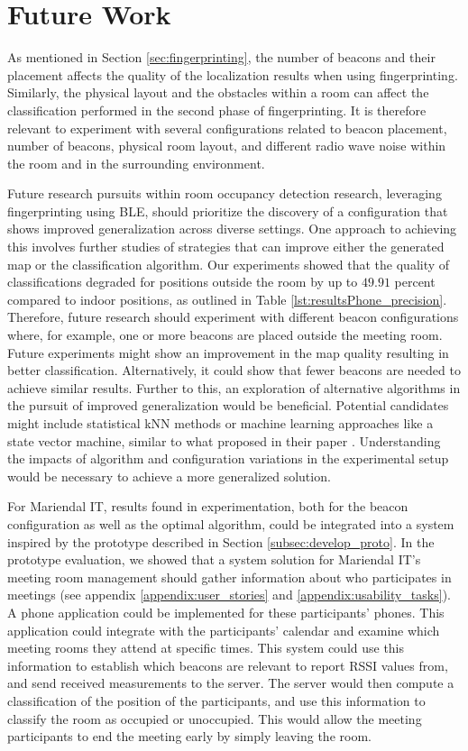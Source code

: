 \chapter{Future Work}
As mentioned in Section \ref{sec:fingerprinting}, the number of beacons and their placement affects the quality of the localization results when using fingerprinting. 
Similarly, the physical layout and the obstacles within a room can affect the classification performed in the second phase of fingerprinting. 
It is therefore relevant to experiment with several configurations related to beacon placement, number of beacons, physical room layout, and different radio wave noise within the room and in the surrounding environment. 

Future research pursuits within room occupancy detection research, leveraging fingerprinting using BLE, should prioritize the discovery of a configuration that shows improved generalization across diverse settings. 
One approach to achieving this involves further studies of strategies that can improve either the generated map or the classification algorithm.
Our experiments showed that the quality of classifications degraded for positions outside the room by up to $49.91$ percent compared to indoor positions, as outlined in Table \ref{lst:resultsPhone_precision}. Therefore, future research should experiment with different beacon configurations where, for example, one or more beacons are placed outside the meeting room. 
Future experiments might show an improvement in the map quality resulting in better classification. Alternatively, it could show that fewer beacons are needed to achieve similar results. 
Further to this, an exploration of alternative algorithms in the pursuit of improved generalization would be beneficial.
Potential candidates might include statistical kNN methods or machine learning approaches like a state vector machine, similar to what \citeauthor{ble_kneares_neural} proposed in their paper \cite{ble_kneares_neural}. 
Understanding the impacts of algorithm and configuration variations in the experimental setup would be necessary to achieve a more generalized solution.

For Mariendal IT, results found in experimentation, both for the beacon configuration as well as the optimal algorithm, could be integrated into a system inspired by the prototype described in Section \ref{subsec:develop_proto}. 
In the prototype evaluation, we showed that a system solution for Mariendal IT's meeting room management should gather information about who participates in meetings (see appendix \ref{appendix:user_stories} and \ref{appendix:usability_tasks}).
A phone application could be implemented for these participants' phones. 
This application could integrate with the participants' calendar and examine which meeting rooms they attend at specific times.
This system could use this information to establish which beacons are relevant to report RSSI values from, and send received measurements to the server. 
The server would then compute a classification of the position of the participants, and use this information to classify the room as occupied or unoccupied. 
This would allow the meeting participants to end the meeting early by simply leaving the room.

